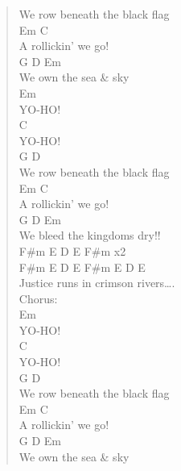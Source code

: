 \documentclass[11pt]{article}
\begin{document}
\begin{verse}
We row beneath the black flag\\
\hspace*{5em}Em         C\\
A rollickin' we go!\\
\hspace*{3em}G       D     Em\\
We own the sea \& sky\\
\vspace*{1em}
\hspace*{3em}Em\\
YO-HO!\\
\hspace*{3em}C\\
YO-HO!\\
\hspace*{3em}G               D\\
We row beneath the black flag\\
\hspace*{5em}Em         C\\
A rollickin' we go!\\
\hspace*{3em}G         D        Em\\
We bleed the kingdoms dry!!\\
\vspace*{1em}
F\#m   E   D E F\#m x2\\
\vspace*{1em}
F\#m E   D    E  F\#m E   D E\\
Justice runs in crimson rivers\ldots{}.\\
\vspace*{1em}
Chorus:\\
\hspace*{3em}Em\\
YO-HO!\\
\hspace*{3em}C\\
YO-HO!\\
\hspace*{3em}G               D\\
We row beneath the black flag\\
\hspace*{5em}Em         C\\
A rollickin' we go!\\
\hspace*{3em}G       D     Em\\
We own the sea \& sky\\
\vspace*{1em}

\end{verse}
\end{document}
